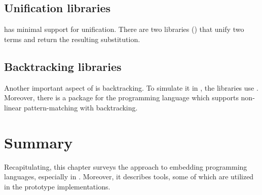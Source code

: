 \documentclass[thesis-solanki.tex]{subfiles}
\begin{document}
\subsection{Unification libraries}
 has minimal support for unification.
There are two libraries (\cite{cmu-lib,unification-fd-lib}) that unify two terms and return
the resulting substitution.

\subsection{Backtracking libraries}

Another important aspect of  is backtracking.
To simulate it in , the libraries \cite{stream-monad-lib, logicst-lib} use
.
Moreover, there is a package for the  programming language \cite{egison-lib} which supports
non-linear pattern-matching with backtracking.




\section{Summary}
Recapitulating, this chapter surveys the approach to embedding programming languages, especially 
in .
Moreover, it describes tools, some of which are utilized in the prototype implementations.

\ifMain\ifDraft
\begin{scope}
  \nolinenumbers
  \enotesize
  \par
  \begin{singlespace}
  \setlength{\parskip}{12pt plus 2pt minus 1pt}
  \theendnotes
  \par
  \end{singlespace}
\end{scope}
\fi\fi
\end{document}
